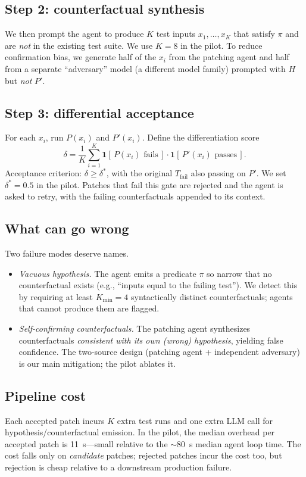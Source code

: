 \documentclass[sigconf,review,anonymous,nonacm]{acmart}
\begin{document}
\subsection{Step 2: counterfactual synthesis}
We then prompt the agent to produce $K$ test inputs $x_1,\dots,x_K$ that
satisfy $\pi$ and are \emph{not} in the existing test suite. We use
$K=8$ in the pilot. To reduce confirmation bias, we generate half of
the $x_i$ from the patching agent and half from a separate
``adversary'' model (a different model family) prompted with $H$ but
\emph{not} $P'$.

\subsection{Step 3: differential acceptance}
For each $x_i$, run $P(x_i)$ and $P'(x_i)$. Define the differentiation
score
\[
\delta = \frac{1}{K}\sum_{i=1}^K \mathbf{1}[\,P(x_i) \text{ fails}\,]
       \cdot \mathbf{1}[\,P'(x_i) \text{ passes}\,].
\]
Acceptance criterion: $\delta \geq \delta^*$, with the original
$T_{\text{fail}}$ also passing on $P'$. We set $\delta^* = 0.5$ in the
pilot. Patches that fail this gate are rejected and the agent is asked
to retry, with the failing counterfactuals appended to its context.

\subsection{What can go wrong}
Two failure modes deserve names.
\begin{itemize}
\item \emph{Vacuous hypothesis.} The agent emits a predicate $\pi$ so
narrow that no counterfactual exists (e.g., ``inputs equal to the
failing test''). We detect this by requiring at least
$K_{\min}\!=\!4$ syntactically distinct counterfactuals; agents that
cannot produce them are flagged.
\item \emph{Self-confirming counterfactuals.} The patching agent
synthesizes counterfactuals \emph{consistent with its own (wrong)
hypothesis}, yielding false confidence. The two-source design (patching
agent + independent adversary) is our main mitigation; the pilot
ablates it.
\end{itemize}

\subsection{Pipeline cost}
Each accepted patch incurs $K$ extra test runs and one extra LLM call
for hypothesis/counterfactual emission. In the pilot, the median
overhead per accepted patch is 11~s---small relative to the $\sim$80~s
median agent loop time. The cost falls only on \emph{candidate}
patches; rejected patches incur the cost too, but rejection is cheap
relative to a downstream production failure.
\end{document}
